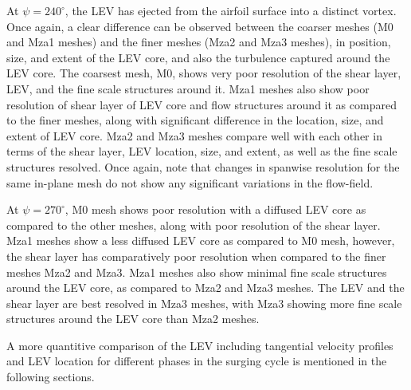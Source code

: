 At $\psi=240^\circ$, the LEV has ejected from the airfoil surface into a distinct vortex. 
Once again, a clear difference can be observed between the coarser meshes (M0 and Mza1 meshes) and the finer meshes (Mza2 and Mza3 meshes), in position, size, and extent of the LEV core, and also the turbulence captured around the LEV core. 
The coarsest mesh, M0, shows very poor resolution of the shear layer, LEV, and the fine scale structures around it. 
Mza1 meshes also show poor resolution of shear layer of LEV core and flow structures around it as compared to the finer meshes, along with significant difference in the location, size, and extent of LEV core.
Mza2 and Mza3 meshes compare well with each other in terms of the shear layer, LEV location, size, and extent, as well as the fine scale structures resolved.
Once again, note that changes in spanwise resolution for the same in-plane mesh do not show any significant variations in the flow-field. 

At $\psi=270^\circ$, M0 mesh shows poor resolution with a diffused LEV core as compared to the other meshes, along with poor resolution of the shear layer.
Mza1 meshes show a less diffused LEV core as compared to M0 mesh, however, the shear layer has comparatively poor resolution when compared to the finer meshes Mza2 and Mza3. 
Mza1 meshes also show minimal fine scale structures around the LEV core, as compared to Mza2 and Mza3 meshes. 
The LEV and the shear layer are best resolved in Mza3 meshes, with Mza3 showing more fine scale structures around the LEV core than Mza2 meshes.

A more quantitive comparison of the LEV including tangential velocity profiles and LEV location for different phases in the surging cycle is mentioned in the following sections.



